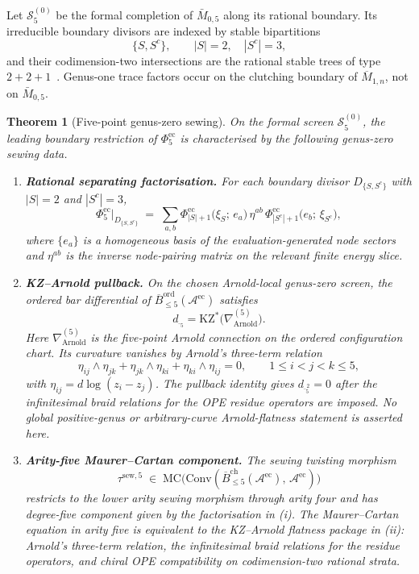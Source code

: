 \documentclass[11pt,reqno]{amsart}
\newtheorem{theorem}{Theorem}[section]
\theoremstyle{definition}
\theoremstyle{remark}
\newcommand{\cA}{\mathcal{A}}
\newcommand{\barB}{\overline{B}}
\newcommand{\Conv}{\mathrm{Conv}}
\newcommand{\MC}{\mathrm{MC}}
\newcommand{\dbar}{d_{\bar{}}}
\begin{document}
Let $\mathscr S_5^{(0)}$ be the formal completion of $\bar M_{0,5}$
along its rational boundary. Its irreducible boundary divisors are
indexed by stable bipartitions
\[
\{S,S^c\}, \qquad |S|=2,\quad |S^c|=3,
\]
and their codimension-two intersections are the rational stable
trees of type $2+2+1$~\cite{DeligneM69,Knudsen83}. Genus-one trace
factors occur on the clutching boundary of $\overline M_{1,n}$, not
on $\bar M_{0,5}$.

\begin{theorem}[Five-point genus-zero sewing]
\label{thm:n5-genus-zero-sewing}
On the formal screen $\mathscr S_5^{(0)}$, the leading boundary
restriction of $\Phi^{\mathrm{ec}}_5$ is characterised by the
following genus-zero sewing data.
\begin{enumerate}[label=(\roman*)]
\item \textbf{Rational separating factorisation.} For each boundary
divisor $D_{\{S,S^c\}}$ with $|S|=2$ and $|S^c|=3$,
\[
\Phi^{\mathrm{ec}}_5\big|_{D_{\{S,S^c\}}}
\;=\;
\sum_{a,b}
\Phi^{\mathrm{ec}}_{|S|+1}\bigl(\xi_S;\, e_a\bigr)\,
\eta^{ab}\,
\Phi^{\mathrm{ec}}_{|S^c|+1}\bigl(e_b;\, \xi_{S^c}\bigr),
\]
where $\{e_a\}$ is a homogeneous basis of the
evaluation-generated node sectors and $\eta^{ab}$ is the inverse
node-pairing matrix on the relevant finite energy slice.

\item \textbf{KZ--Arnold pullback.} On the chosen Arnold-local
genus-zero screen, the ordered bar differential of
$\barB^{\mathrm{ord}}_{\le 5}(\cA^{\mathrm{ec}})$ satisfies
\[
\dbar_{\!5}=\mathrm{KZ}^*\!\bigl(\nabla_{\mathrm{Arnold}}^{(5)}\bigr).
\]
Here $\nabla_{\mathrm{Arnold}}^{(5)}$ is the five-point Arnold
connection on the ordered configuration chart. Its curvature
vanishes by Arnold's three-term relation
\[
\eta_{ij}\wedge\eta_{jk}
+\eta_{jk}\wedge\eta_{ki}
+\eta_{ki}\wedge\eta_{ij}=0,
\qquad 1\le i<j<k\le 5,
\]
with $\eta_{ij}=d\log(z_i-z_j)$. The pullback identity gives
$\dbar_{\!5}^{\,2}=0$ after the infinitesimal braid relations for
the OPE residue operators are imposed. No global positive-genus or
arbitrary-curve Arnold-flatness statement is asserted here.

\item \textbf{Arity-five Maurer--Cartan component.} The sewing
twisting morphism
\[
\tau^{\mathrm{sew},5}
\;\in\;
\MC\bigl(\Conv(\barB^{\mathrm{ch}}_{\le 5}(\cA^{\mathrm{ec}}),\,
\cA^{\mathrm{ec}})\bigr)
\]
restricts to the lower arity sewing morphism through arity four
and has degree-five component given by the factorisation in
\textup{(i)}. The Maurer--Cartan equation in arity five is
equivalent to the KZ--Arnold flatness package in \textup{(ii)}:
Arnold's three-term relation, the infinitesimal braid relations for
the residue operators, and chiral OPE compatibility on
codimension-two rational strata.


\end{enumerate}
\end{theorem}
\end{document}
